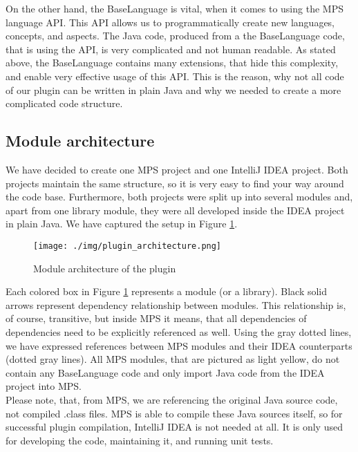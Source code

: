 On the other hand, the BaseLanguage is vital, when it comes to using the MPS language API.
This API allows us to programmatically create new languages, concepts, and aspects.
The Java code, produced from a the BaseLanguage code, that is using the API, is very complicated and not human readable.
As stated above, the BaseLanguage contains many extensions, that hide this complexity, and enable very effective usage of this API.
This is the reason, why not all code of our plugin can be written in plain Java and why we needed to create a more complicated code structure.

\subsection{Module architecture}

We have decided to create one MPS project and one IntelliJ IDEA project.
Both projects maintain the same structure, so it is very easy to find your way around the code base.
Furthermore, both projects were split up into several modules and, apart from one library module, they were all developed inside the IDEA project in plain Java.
We have captured the setup in Figure \ref{fig:plugin_architecture}. 

\begin{figure}[h]
	\centering
	\texttt{[image: ./img/plugin\_architecture.png]}
	\caption{Module architecture of the plugin}
	\label{fig:plugin_architecture}
\end{figure}

Each colored box in Figure \ref{fig:plugin_architecture} represents a module (or a library).
Black solid arrows represent dependency relationship between modules.
This relationship is, of course, transitive, but inside MPS it means, that all dependencies of dependencies need to be explicitly referenced as well.
Using the gray dotted lines, we have expressed references between MPS modules and their IDEA counterparts (dotted gray lines).
All MPS modules, that are pictured as light yellow, do not contain any BaseLanguage code and only import Java code from the IDEA project into MPS.
\\

Please note, that, from MPS, we are referencing the original Java source code, not compiled .class files.
MPS is able to compile these Java sources itself, so for successful plugin compilation, IntelliJ IDEA is not needed at all.
It is only used for developing the code, maintaining it, and running unit tests.

